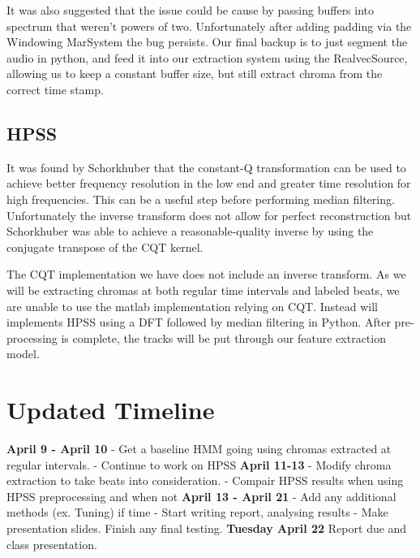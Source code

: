 \documentclass{article}
\begin{document}
It was also suggested that the issue could be cause by passing buffers into
spectrum that weren't powers of two. Unfortunately after adding padding via the
Windowing MarSystem the bug persists. Our final backup is to just segment the
audio in python, and feed it into our extraction system using the
RealvecSource, allowing us to keep a constant buffer size, but still extract
chroma from the correct time stamp.

\subsection{HPSS}
It was found by Schorkhuber \cite{Schorkhuber:21} that the constant-Q
transformation can be used to achieve better frequency resolution in the low
end and greater time resolution for high frequencies. This can be a useful step
before performing median filtering. Unfortunately the inverse transform does
not allow for perfect reconstruction but Schorkhuber was able to achieve a
reasonable-quality inverse by using the conjugate transpose of the CQT kernel.

The CQT implementation we have does not include an inverse transform. As we
will be extracting chromas at both regular time intervals and labeled beats, we
are unable to use the matlab implementation relying on CQT.  Instead will
implements HPSS using a DFT followed by median filtering in Python. After
pre-processing is complete, the tracks will be put through our feature
extraction model.

\section{Updated Timeline}\label{sec:timeline}

{\bf April 9 - April 10}\newline
- Get a baseline HMM going using chromas extracted at regular intervals.
- Continue to work on HPSS
\newline
{\bf April 11-13}\newline
- Modify chroma extraction to take beats into consideration.
- Compair HPSS results when using HPSS preprocessing and when not
\newline
{\bf April 13 - April 21}\newline
- Add any additional methods (ex. Tuning) if time
- Start writing report, analysing results
- Make presentation slides. Finish any final testing.
\newline
{\bf Tuesday April 22}\newline
Report due and class presentation.
\end{document}
